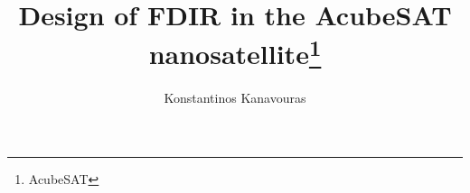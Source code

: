 \documentclass[a4paper,nobib,final]{tufte-book}
\title{Design of FDIR in the AcubeSAT nanosatellite\thanks{AcubeSAT}}
\author[Konstantinos Kanavouras]{Konstantinos Kanavouras}
\begin{document}


\makeatletter
\renewcommand{\maketitle}{%
	\newpage
	\global\@topnum\z@%
	\begingroup
	\setlength{\parindent}{0pt}%
	\setlength{\parskip}{4pt}%
	\let\@@title\@empty
	\let\@@author\@empty
	\let\@@date\@empty
	\thispagestyle{empty}
	\begin{fullwidth}
		\vfill
		\begin{center}
			\href{https://www.auth.gr/}{\texttt{[image: auth\_logo\_text]}}\par
			\vspace{1cm}
			\LARGE\textsc{Diploma Thesis}\par
			\vspace{6ex}
			\hrule
			\vspace{4ex}
			\Huge\textbf{Design of Fault Detection, Isolation and Recovery}\\[1ex]
			\LARGE\textbf{in the}\\
			\Huge\textbf{AcubeSAT NanoSatellite}\par
			\vspace{2.7ex}
			\hrule

			\vspace{6ex}

			\Large
			\begin{tabular}{ll}
				\emph{Author:} & \href{https://github.com/kongr45gpen}{Konstantinos \textsc{Kanavouras} \normalsize (\fontfamily{pplx}\selectfont 8824)}
				\\[1.5ex]
				\emph{Supervisor:} & \href{http://ee.auth.gr/en/school/faculty-staff/electronics-computers-department/hatzopoulos-alkiviadis/}{Prof. Alkiviadis \textsc{Hatzopoulos}}
			\end{tabular}

			\vspace{6ex}

			\large \textit{A thesis submitted in fulfillment of the requirements\\ for the diploma in Electrical \& Computer Engineering}\\[0.3cm] %
			\textit{in the}\\[0.4cm]
			\href{https://www.eng.auth.gr/en/home.html}{Faculty of Engineering}
			\\
			\href{https://ee.auth.gr/en/}{Electrical \& Computer Engineering Department}
			\\[1cm] %

			\vspace{6ex}

			{\large June 28, 2021}\\[4cm] %

		\end{center}
		\vfill
	\end{fullwidth}
	\endgroup
	\thispagestyle{plain}%
	\tuftebreak%
	\@afterindentfalse\@afterheading%
}
\end{document}
